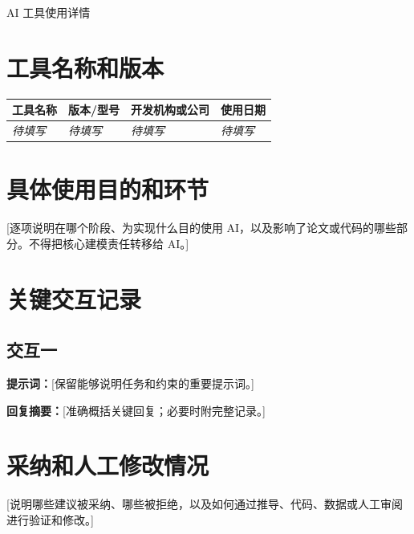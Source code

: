 \documentclass[UTF8,a4paper,zihao=5]{ctexart}
\begin{document}
\begin{center}
  {\heiti{} AI 工具使用详情}
\end{center}

\section{工具名称和版本}

\begin{longtable}{p{}p{}p{}p{}}
  \toprule
  工具名称 & 版本/型号 & 开发机构或公司 & 使用日期 \\
  \midrule
  \textit{待填写} & \textit{待填写} & \textit{待填写} & \textit{待填写} \\
  \bottomrule
\end{longtable}

\section{具体使用目的和环节}

[逐项说明在哪个阶段、为实现什么目的使用 AI，以及影响了论文或代码的哪些部分。不得把核心建模责任转移给 AI。]

\section{关键交互记录}

\subsection{交互一}

\noindent\textbf{提示词：}[保留能够说明任务和约束的重要提示词。]

\noindent\textbf{回复摘要：}[准确概括关键回复；必要时附完整记录。]

\section{采纳和人工修改情况}

[说明哪些建议被采纳、哪些被拒绝，以及如何通过推导、代码、数据或人工审阅进行验证和修改。]
\end{document}
